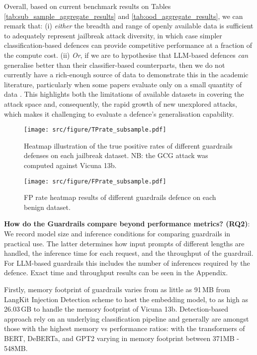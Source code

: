 Overall, based on current benchmark results on Tables \ref{tab:sub_sample_aggregate_results} and \ref{tab:ood_aggregate_results}, we can remark that: (i) \emph{either} the breadth and range of openly available data is sufficient to adequately represent jailbreak attack diversity, in which case simpler classification-based defences can provide competitive performance at a fraction of the compute cost. (ii) \emph{Or}, if we are to hypothesise that LLM-based defences \emph{can} generalise better than their classifier-based counterparts, then we do not currently have a rich-enough source of data to demonstrate this in the academic literature, particularly when some papers evaluate only on a small quantity of data \cite{robey2023smoothllm}. This highlights both the limitations of available datasets in covering the attack space and, consequently, the rapid growth of new unexplored attacks, which makes it challenging to evaluate a defence's generalisation capability. 

\begin{figure}
    \centering
    \centerline{\texttt{[image: src/figure/TPrate\_subsample.pdf]}}
    \caption{Heatmap illustration of the true positive rates of different guardrails defenses on each jailbreak dataset. NB: the GCG attack was computed against Vicuna 13b.}
    \label{fig:TPrate}
\end{figure}
\begin{figure}
    \centering
    \centerline{\texttt{[image: src/figure/FPrate\_subsample.pdf]}}
    \caption{FP rate heatmap results of different guardrails defence on each benign dataset.}
    \label{fig:FPrate}
\end{figure}


\textbf{How do the Guardrails compare beyond performance metrics? (RQ2)}:
\label{sec:results_rq2}
We record model size and inference conditions for comparing guardrails in practical use.
The latter determines how input prompts of different lengths are handled, the inference time for each request, and the throughput of the guardrail.
For LLM-based guardrails this includes the number of inferences required by the defence. Exact time and throughput results can be seen in the Appendix. 

Firstly, memory footprint of guardrails varies from as little as 91\,MB from LangKit Injection Detection scheme to host the embedding model, to as high as 26.03\,GB to handle the memory footprint of Vicuna 13b. Detection-based approach rely on an underlying classification pipeline and generally are amongst those with the highest memory vs performance ratios: with the transformers of BERT, DeBERTa, and GPT2 varying in memory footprint between 371MB - 548MB.

